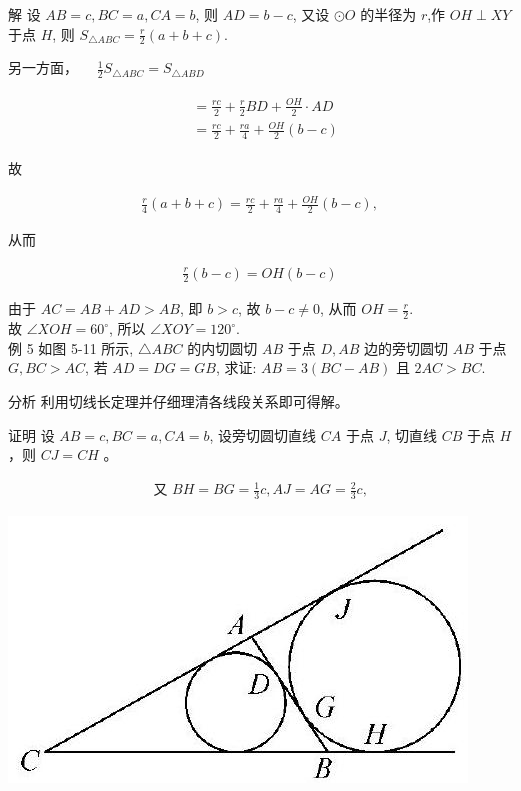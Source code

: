 \documentclass[10pt]{article}
\begin{document}
解 设 $A B=c, B C=a, C A=b$, 则 $A D=b-c$, 又设 $\odot O$ 的半径为 $r$,作 $O H \perp X Y$ 于点 $H$, 则 $S_{\triangle A B C}=\frac{r}{2}(a+b+c)$.

另一方面， $\quad \frac{1}{2} S_{\triangle A B C}=S_{\triangle A B D}$

\begin{align*}
\begin{aligned}
& =\frac{r c}{2}+\frac{r}{2} B D+\frac{O H}{2} \cdot A D \\
& =\frac{r c}{2}+\frac{r a}{4}+\frac{O H}{2}(b-c)
\end{aligned}
\end{align*}

故

\begin{align*}
\frac{r}{4}(a+b+c)=\frac{r c}{2}+\frac{r a}{4}+\frac{O H}{2}(b-c),
\end{align*}

从而

\begin{align*}
\frac{r}{2}(b-c)=O H(b-c)
\end{align*}

由于 $A C=A B+A D>A B$, 即 $b>c$, 故 $b-c \neq 0$, 从而 $O H=\frac{r}{2}$.\\
故 $\angle X O H=60^{\circ}$, 所以 $\angle X O Y=120^{\circ}$.\\
例 5 如图 5-11 所示, $\triangle A B C$ 的内切圆切 $A B$ 于点 $D, A B$ 边的旁切圆切 $A B$ 于点 $G, B C>A C$, 若 $A D=D G=G B$, 求证: $A B=3(B C-A B)$ 且 $2 A C>B C$.

分析 利用切线长定理并仔细理清各线段关系即可得解。

证明 设 $A B=c, B C=a, C A=b$, 设旁切圆切直线 $C A$ 于点 $J$, 切直线 $C B$ 于点 $H$ ，则 $C J=C H$ 。

\begin{align*}
\text { 又 } B H=B G=\frac{1}{3} c, A J=A G=\frac{2}{3} c \text {, }
\end{align*}

\begin{center}
\includegraphics[max width=\textwidth]{2024_10_30_66b8e5e701da2093c133g-038(2)}
\end{center}
\end{document}
